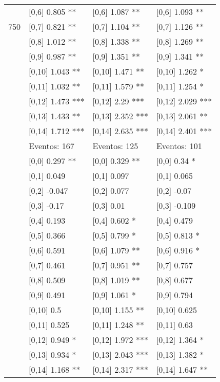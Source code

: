 \begin{table}
\begin{tabular}[t]{llll}
 & {}[0,6] 0.805 ** & {}[0,6] 1.087 ** & {}[0,6] 1.093 **\\
750 & {}[0,7] 0.821 ** & {}[0,7] 1.104 ** & {}[0,7] 1.126 **\\
\addlinespace
 & {}[0,8] 1.012 ** & {}[0,8] 1.338 ** & {}[0,8] 1.269 **\\
 & {}[0,9] 0.987 ** & {}[0,9] 1.351 ** & {}[0,9] 1.341 **\\
 & {}[0,10] 1.043 ** & {}[0,10] 1.471 ** & {}[0,10] 1.262 *\\
 & {}[0,11] 1.032 ** & {}[0,11] 1.579 ** & {}[0,11] 1.254 *\\
 & {}[0,12] 1.473 *** & {}[0,12] 2.29 *** & {}[0,12] 2.029 ***\\
\addlinespace
 & {}[0,13] 1.433 ** & {}[0,13] 2.352 *** & {}[0,13] 2.061 **\\
 & {}[0,14] 1.712 *** & {}[0,14] 2.635 *** & {}[0,14] 2.401 ***\\
 & Eventos:  167 & Eventos:  125 & Eventos:  101\\
 & {}[0,0] 0.297 ** & {}[0,0] 0.329 ** & {}[0,0] 0.34 *\\
 & {}[0,1] 0.049 & {}[0,1] 0.097 & {}[0,1] 0.065\\
\addlinespace
 & {}[0,2] -0.047 & {}[0,2] 0.077 & {}[0,2] -0.07\\
 & {}[0,3] -0.17 & {}[0,3] 0.01 & {}[0,3] -0.109\\
 & {}[0,4] 0.193 & {}[0,4] 0.602 * & {}[0,4] 0.479\\
 & {}[0,5] 0.366 & {}[0,5] 0.799 * & {}[0,5] 0.813 *\\
 & {}[0,6] 0.591 & {}[0,6] 1.079 ** & {}[0,6] 0.916 *\\
\addlinespace
1000 & {}[0,7] 0.461 & {}[0,7] 0.951 ** & {}[0,7] 0.757\\
 & {}[0,8] 0.509 & {}[0,8] 1.019 ** & {}[0,8] 0.677\\
 & {}[0,9] 0.491 & {}[0,9] 1.061 * & {}[0,9] 0.794\\
 & {}[0,10] 0.5 & {}[0,10] 1.155 ** & {}[0,10] 0.625\\
 & {}[0,11] 0.525 & {}[0,11] 1.248 ** & {}[0,11] 0.63\\
\addlinespace
 & {}[0,12] 0.949 * & {}[0,12] 1.972 *** & {}[0,12] 1.364 *\\
 & {}[0,13] 0.934 * & {}[0,13] 2.043 *** & {}[0,13] 1.382 *\\
 & {}[0,14] 1.168 ** & {}[0,14] 2.317 *** & {}[0,14] 1.647 **\\
\bottomrule
\end{tabular}
\end{table}
